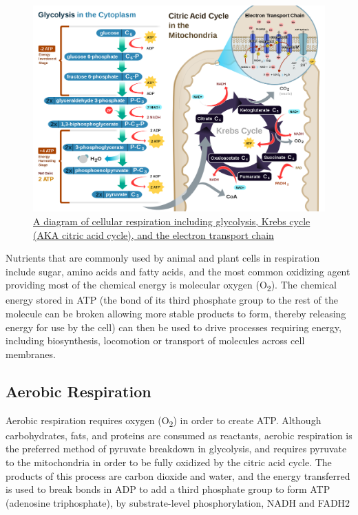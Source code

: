 \begin{figure}

{\centering \includegraphics[width=0.7\linewidth]{./figures/photosynthesis/CellRespiration} 

}

\caption{\href{https://commons.wikimedia.org/wiki/File:CellRespiration.svg}{A diagram of cellular respiration including glycolysis, Krebs cycle (AKA citric acid cycle), and the electron transport chain}}\label{fig:cellularrespiration}
\end{figure}

Nutrients that are commonly used by animal and plant cells in respiration include sugar, amino acids and fatty acids, and the most common oxidizing agent providing most of the chemical energy is molecular oxygen (O\textsubscript{2}). The chemical energy stored in ATP (the bond of its third phosphate group to the rest of the molecule can be broken allowing more stable products to form, thereby releasing energy for use by the cell) can then be used to drive processes requiring energy, including biosynthesis, locomotion or transport of molecules across cell membranes.

\hypertarget{aerobic-respiration}{%
\subsection{Aerobic Respiration}\label{aerobic-respiration}}

Aerobic respiration requires oxygen (O\textsubscript{2}) in order to create ATP. Although carbohydrates, fats, and proteins are consumed as reactants, aerobic respiration is the preferred method of pyruvate breakdown in glycolysis, and requires pyruvate to the mitochondria in order to be fully oxidized by the citric acid cycle. The products of this process are carbon dioxide and water, and the energy transferred is used to break bonds in ADP to add a third phosphate group to form ATP (adenosine triphosphate), by substrate-level phosphorylation, NADH and FADH2

